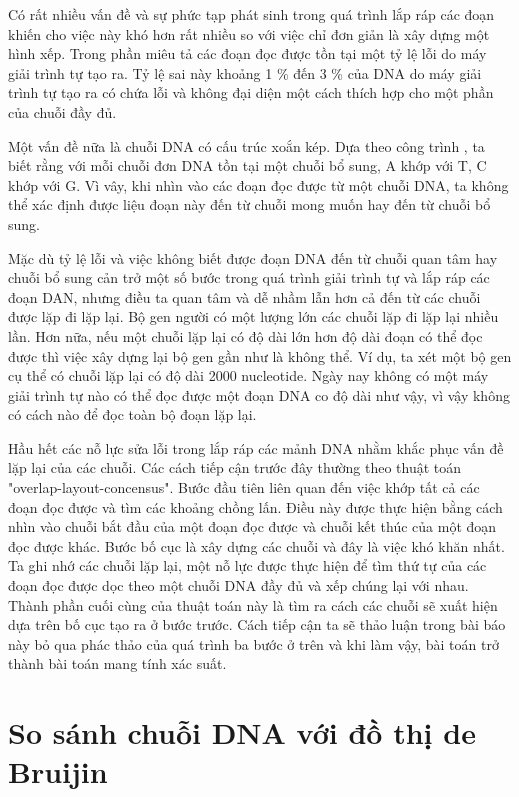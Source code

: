 \documentclass[14pt, a4paper]{article}
\numberwithin{equation}{section}
\numberwithin{figure}{section}
\numberwithin{dl}{section}
\numberwithin{md}{section}
\numberwithin{bd}{section}
\numberwithin{dn}{section}
\numberwithin{hq}{section}
\begin{document}
    Có rất nhiều vấn đề và sự phức tạp phát sinh trong quá trình lắp ráp các đoạn khiến cho việc này khó hơn rất nhiều so với việc chỉ đơn giản là xây dựng một hình xếp.
    Trong phần miêu tả các đoạn đọc được tồn tại một tỷ lệ lỗi do máy giải trình tự tạo ra.
    Tỷ lệ sai này khoảng 1 \% đến 3 \% của DNA do máy giải trình tự tạo ra có chứa lỗi và không đại diện một cách thích hợp cho một phần của chuỗi đầy đủ.

    Một vấn đề nữa là chuỗi DNA có cấu trúc xoắn kép.
    Dựa theo công trình \cite{watson2003molecular}, ta biết rằng với mỗi chuỗi đơn DNA tồn tại một chuỗi bổ sung, A khớp với T, C khớp với G.
    Vì vây, khi nhìn vào các đoạn đọc được từ một chuỗi DNA, ta không thể xác định được liệu đoạn này đến từ chuỗi mong muốn hay đến từ chuỗi bổ sung.

    Mặc dù tỷ lệ lỗi và việc không biết được đoạn DNA đến từ chuỗi quan tâm hay chuỗi bổ sung cản trở một số bước trong quá trình giải trình tự và lắp ráp các đoạn DAN, nhưng điều ta quan tâm và dễ nhầm lẫn hơn cả đến từ các chuỗi được lặp đi lặp lại.
    Bộ gen người có một lượng lớn các chuỗi lặp đi lặp lại nhiều lần.
    Hơn nữa, nếu một chuỗi lặp lại có độ dài lớn hơn độ dài đoạn có thể đọc được thì việc xây dựng lại bộ gen gần như là không thể.
    Ví dụ, ta xét một bộ gen cụ thể có chuỗi lặp lại có độ dài 2000 nucleotide.
    Ngày nay không có một máy giải trình tự nào có thể đọc được một đoạn DNA co độ dài như vậy, vì vậy không có cách nào để đọc toàn bộ đoạn lặp lại.

    Hầu hết các nỗ lực sửa lỗi trong lắp ráp các mảnh DNA nhằm khắc phục vấn đề lặp lại của các chuỗi.
    Các cách tiếp cận trước đây thường theo thuật toán "overlap-layout-concensus".
    Bước đầu tiên liên quan đến việc khớp tất cả các đoạn đọc được và tìm các khoảng chồng lấn.
    Điều này được thực hiện bằng cách nhìn vào chuỗi bắt đầu của một đoạn đọc được và chuỗi kết thúc của một đoạn đọc được khác.
    Bước bố cục là xây dựng các chuỗi và đây là việc khó khăn nhất.
    Ta ghi nhớ các chuỗi lặp lại, một nỗ lực được thực hiện để tìm thứ tự của các đoạn đọc được dọc theo một chuỗi DNA đầy đủ và xếp chúng lại với nhau.
    Thành phần cuối cùng của thuật toán này là tìm ra cách các chuỗi sẽ xuất hiện dựa trên bố cục tạo ra ở bước trước.
    Cách tiếp cận ta sẽ thảo luận trong bài báo này bỏ qua phác thảo của quá trình ba bước ở trên và khi làm vậy, bài toán trở thành bài toán mang tính xác suất.
    
    \section{So sánh chuỗi DNA với đồ thị de Bruijin}
\end{document}
